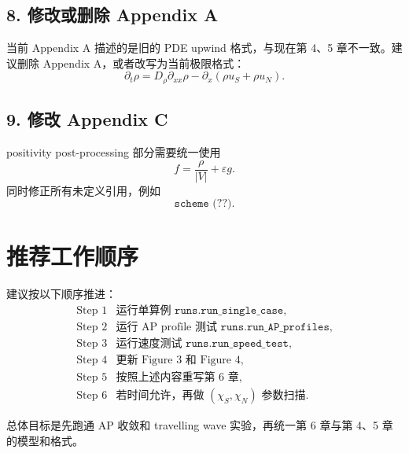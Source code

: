 \subsection*{8. 修改或删除 Appendix A}

当前 Appendix A 描述的是旧的 PDE upwind 格式，与现在第 4、5 章不一致。建议删除 Appendix A，或者改写为当前极限格式：
\[
\partial_t\rho
=
D_\rho\partial_{xx}\rho
-
\partial_x(\rho u_S+\rho u_N).
\]

\subsection*{9. 修改 Appendix C}

positivity post-processing 部分需要统一使用
\[
f=\frac{\rho}{|V|}+\varepsilon g.
\]
同时修正所有未定义引用，例如
\[
\texttt{scheme (??)}.
\]

\section*{推荐工作顺序}

建议按以下顺序推进：
\[
\begin{array}{ll}
\text{Step 1} & \text{运行单算例 } \texttt{runs.run\_single\_case},\\
\text{Step 2} & \text{运行 AP profile 测试 } \texttt{runs.run\_AP\_profiles},\\
\text{Step 3} & \text{运行速度测试 } \texttt{runs.run\_speed\_test},\\
\text{Step 4} & \text{更新 Figure 3 和 Figure 4},\\
\text{Step 5} & \text{按照上述内容重写第 6 章},\\
\text{Step 6} & \text{若时间允许，再做 } (\chi_S,\chi_N) \text{ 参数扫描}.
\end{array}
\]

总体目标是先跑通 AP 收敛和 travelling wave 实验，再统一第 6 章与第 4、5 章的模型和格式。